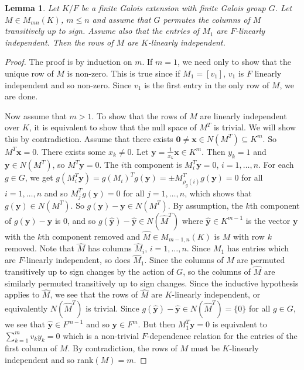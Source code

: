 \documentclass[12pt]{article}
\theoremstyle{plain}
\newtheorem{lemma}[theorem]{Lemma}
\begin{document}
\begin{lemma}\label{signdet}
   Let $K/F$ be a finite Galois extension with finite Galois group
   $G$. Let $M \in M_{mn}(K)$, $m \leq n$ and assume that $G$ permutes
   the columns of $M$ transitively up to sign. Assume also that the
   entries of $M_1$ are $F$-linearly independent. Then the rows of $M$
   are $K$-linearly independent.
\end{lemma}
\begin{proof}
The proof is by induction on $m$. If $m = 1$, we need only to show
that the unique row of $M$ is non-zero. This is true since if $M_1 =
[v_1]$, $v_1$ is $F$ linearly independent and so non-zero. Since $v_1$
is the first entry in the only row of $M$, we are done.

Now assume that $m >1$. To show that the rows of $M$ are linearly
independent over $K$, it is equivalent to show that the null space of
$M^T$ is trivial. We will show this by contradiction. Assume that
there exists $\textbf{0} \neq \textbf{x} \in N(M^T) \subseteq K^m$. So
$M^T\textbf{x} = 0$. There exists some $x_k \neq 0$. Let $\textbf{y}=
\frac{1}{x_k}\textbf{x} \in K^m$. Then $y_k = 1$ and $\textbf{y}\in
N(M^T)$, so $M^T \textbf{y}=0$. The $i$th component is $M^T_i
\textbf{y}= 0 $, $i = 1, \ldots, n$. For each $g \in G$, we get
$g(M^T_i \textbf{y}) = g(M_i)^Tg(\textbf{y}) = \pm
M^T_{\rho_g(i)}g(\textbf{y}) = 0$ for all $i = 1, \ldots , n$ and so
$M^T_jg(\textbf{y}) = 0$ for all $j = 1, \ldots , n$, which shows that
$g(\textbf{y}) \in N(M^T)$. So $g(\textbf{y}) -\textbf{y} \in
N(M^T)$. By assumption, the $k$th component of $g(\textbf{y}) -
\textbf{y} $ is $0$, and so $g(\hat{\textbf{y}}) - \hat{\textbf{y}}\in
N(\hat{M}^T)$ where $\hat{\textbf{y}} \in K^{m-1}$ is the vector
$\textbf{y}$ with the $k$th component removed and $\hat{M} \in
M_{m-1,n}(K)$ is $M$ with row $k$ removed. Note that $\hat{M}$ has
columns $\hat{M}_i$, $i = 1, \ldots, n$. Since $M_1$ has entries which
are $F$-linearly independent, so does $\hat{M}_1$. Since the columns
of $M$ are permuted transitively up to sign changes by the action of
$G$, so the columns of $\hat{M}$ are similarly permuted transitively
up to sign changes. Since the inductive hypothesis applies to
$\hat{M}$, we see that the rows of $\hat{M}$ are $K$-linearly
independent, or equivalently $N(\hat{M}^T)$ is trivial. Since
$g(\hat{\textbf{y}}) -\hat{\textbf{y}} \in N(\hat{M}^T) = \lbrace 0
\rbrace$ for all $ g \in G$, we see that $\hat{\textbf{y}}\in F^{m-1}$
and so $\textbf{y} \in F^m$. But then $M^T_1 \textbf{y} = 0 $ is
equivalent to $\sum^m_{k = 1}v_ky_k = 0$ which is a non-trivial
$F$-dependence relation for the entries of the first column of $M$. By
contradiction, the rows of $M$ must be $K$-linearly independent and so
rank$(M) = m$.
 \end{proof} 
\end{document}
